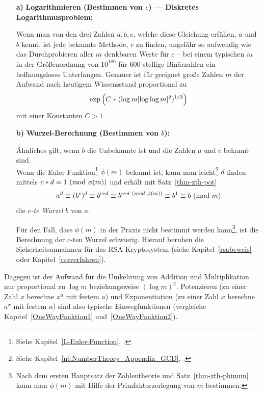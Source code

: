 \begin{refsegment}
\begin{itemize}
\item [\textbf{a)}]
      \textbf{Logarithmieren (Bestimmen von $c$) ---
       Diskretes Logarithmusproblem\footnotemark:}

Wenn man von den drei Zahlen $a, b, c$, welche diese Gleichung erfüllen,
$a$ und $b$ kennt, ist jede bekannte Methode, $c$ zu finden, ungefähr so
aufwendig wie das Durchprobieren aller $m$ denkbaren Werte für $c$ -- bei
einem typischen $m$ in der Größenordnung von $10^{180}$ für
$600$-stellige Binärzahlen ein hoffnungsloses Unterfangen. Genauer ist für
geeignet große Zahlen $m$ der Aufwand nach heutigem Wissensstand proportional
zu
\[
{\rm exp}\left( C*( \log m [\log \log m]^2)^{1/3}\right)
\]
mit einer Konstanten $C > 1$.


\item[\textbf{b)}] \textbf{Wurzel-Berechnung (Bestimmen von $b$):}

Ähnliches gilt, wenn $b$ die Unbekannte ist und die Zahlen $a$ und $c$ bekannt
sind.\\
Wenn die Euler-Funktion\footnote{%
  Siehe Kapitel~\ref{L-Euler-Function}, \glqq {}\grqq.
}  $\phi(m)$ bekannt ist, kann man leicht\footnote{%
  Siehe Kapitel~\ref{nt:NumberTheory_Appendix_GCD}, \glqq {}\grqq.
}
$d$ finden mittels $c*d \equiv 1 {\rm ~(mod~} \phi(m))$
und erhält mit Satz~\ref{thm-zth-pot}
$$
   a^d \equiv (b^c)^d \equiv b^{c*d} \equiv b^{c*d~(mod~\phi(m))} \equiv b^1 \equiv b {\rm ~(mod~} m)
$$
die {\em $c$-te Wurzel} $b$ von $a$. \par

Für den Fall, dass $\phi(m)$ in der Praxis nicht bestimmt werden
kann\footnote{%
Nach dem ersten Hauptsatz der Zahlentheorie und Satz~\ref{thm-zth-phinum}
kann man $\phi(m)$ mit Hilfe der Primfaktorzerlegung
von $m$ bestimmen.
}, ist die Berechnung der $c$-ten Wurzel schwierig. Hierauf beruhen die
Sicherheitsannahmen für das RSA-Kryptosystem (siehe Kapitel~\ref{rsabeweis}
oder Kapitel~\ref{rsaverfahren}).

\end{itemize}
Dagegen ist der Aufwand für die Umkehrung von Addition und Multiplikation
nur proportional zu $\log m$ beziehungsweise $(\log m)^2$.
Potenzieren (zu einer Zahl $x$ berechne $x^a$ mit festem $a$) und Exponentiation
(zu einer Zahl $x$ berechne $a^x$ mit festem $a$) sind also typische
Einwegfunktionen
(vergleiche Kapitel~\ref{OneWayFunktion1} und~\ref{OneWayFunktion2}).



\end{refsegment}
